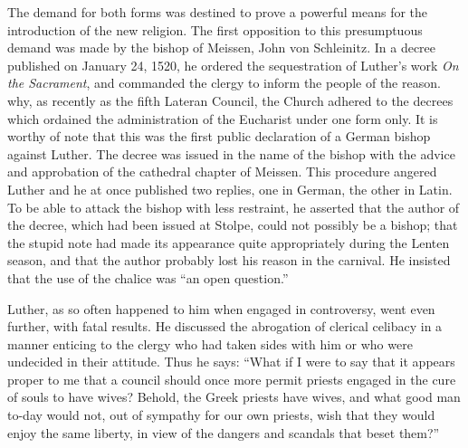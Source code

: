 The demand for both forms was destined to prove a powerful
means for the introduction of the new religion.
The first opposition to this presumptuous demand was made by
the bishop of Meissen, John von Schleinitz. In a decree published on
January 24, 1520, he ordered the sequestration of Luther’s work
\textit{On the Sacrament}, and commanded the clergy to inform the people
of the reason. why, as recently as the fifth Lateran Council, the
Church adhered to the decrees which ordained the administration of
the Eucharist under one form only. It is worthy of note that this
was the first public declaration of a German bishop against Luther.
The decree was issued in the name of the bishop with the advice
and approbation of the cathedral chapter of Meissen. This procedure
angered Luther and he at once published two replies, one in German, the
other in Latin. To be able to attack the bishop with less
restraint, he asserted that the author of the decree, which had been
issued at Stolpe, could not possibly be a bishop; that the stupid note
had made its appearance quite appropriately during the Lenten
season, and that the author probably lost his reason in the carnival.
He insisted that the use of the chalice was “an open question.”

Luther, as so often happened to him when engaged in controversy,
went even further, with fatal results. He discussed the abrogation of
clerical celibacy in a manner enticing to the clergy who had taken
sides with him or who were undecided in their attitude. Thus he
says: “What if I were to say that it appears proper to me that a
council should once more permit priests engaged in the cure of souls
to have wives? Behold, the Greek priests have wives, and what good
man to-day would not, out of sympathy for our own priests, wish
that they would enjoy the same liberty, in view of the dangers and
scandals that beset them?”

